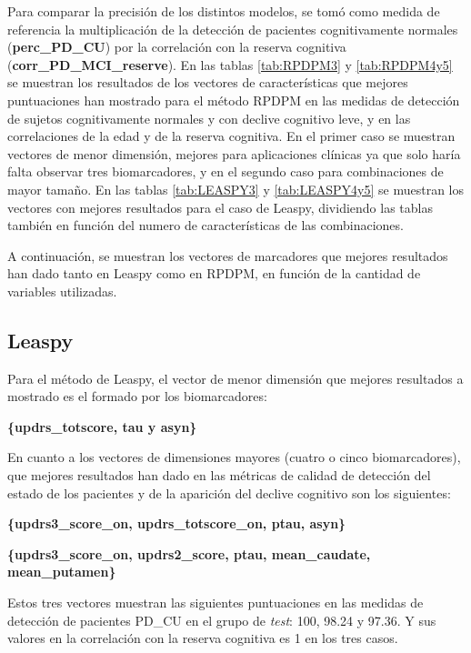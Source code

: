 Para comparar la precisión de los distintos modelos, se tomó como medida de referencia la multiplicación de la detección de pacientes cognitivamente normales (\textbf{perc\_PD\_CU}) por la correlación con la reserva cognitiva (\textbf{corr\_PD\_MCI\_reserve}). En las tablas \ref{tab:RPDPM3} y \ref{tab:RPDPM4y5} se muestran los resultados de los vectores de características que mejores puntuaciones han mostrado para el método RPDPM en las medidas de detección de sujetos cognitivamente normales y con declive cognitivo leve, y en las correlaciones de la edad y de la reserva cognitiva. En el primer caso se muestran vectores de menor dimensión, mejores para aplicaciones clínicas ya que solo haría falta observar tres biomarcadores, y en el segundo caso para combinaciones de mayor tamaño. En las tablas \ref{tab:LEASPY3} y \ref{tab:LEASPY4y5} se muestran los vectores con mejores resultados para el caso de Leaspy, dividiendo las tablas también en función del numero de características de las combinaciones.

A continuación, se muestran los vectores de marcadores que mejores resultados han dado tanto en Leaspy como en RPDPM, en función de la cantidad de variables utilizadas. 

\subsection{Leaspy}
Para el método de Leaspy, el vector de menor dimensión que mejores resultados a mostrado es el formado por los biomarcadores:
\begin{center}
	\textbf{\{updrs\_totscore, tau y asyn\}}
\end{center}
En cuanto a los vectores de dimensiones mayores (cuatro o cinco biomarcadores), que mejores resultados han dado en las métricas de calidad de detección del estado de los pacientes y de la aparición del declive cognitivo son los siguientes:
\begin{center}
	\textbf{\{updrs3\_score\_on, updrs\_totscore\_on, ptau, asyn\}}		
\end{center}
\begin{center}
	\textbf{\{updrs3\_score\_on, updrs2\_score, ptau, mean\_caudate, mean\_putamen\}}
\end{center}

Estos tres vectores muestran las siguientes puntuaciones en las medidas de detección de pacientes PD\_CU en el grupo de \textit{test}: 100, 98.24 y 97.36. Y sus valores en la correlación con la reserva cognitiva es 1 en los tres casos. \\

